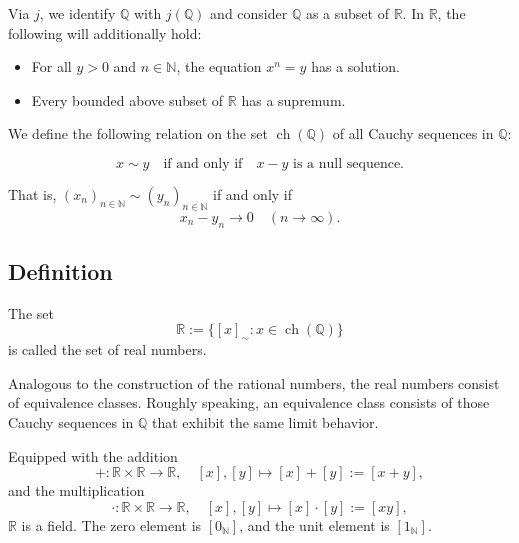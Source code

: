 Via \( j \), we identify \( \mathbb{Q} \) with \( j(\mathbb{Q}) \) and consider \( \mathbb{Q} \) as a subset of \( \mathbb{R} \). In \( \mathbb{R} \), the following will additionally hold:

\begin{itemize}[label=\(-\)]
	\item For all \( y > 0 \) and \( n \in \mathbb{N} \), the equation \( x^n = y \) has a solution.

	\item Every bounded above subset of \( \mathbb{R} \) has a supremum.
\end{itemize}

We define the following relation on the set \( \operatorname{ch}(\mathbb{Q}) \) of all Cauchy sequences in \( \mathbb{Q} \):

\[
	x \sim y \quad \text{if and only if} \quad x - y \text{ is a null sequence}.
\]

That is, \( {(x_n)}_{n \in \mathbb{N}} \sim {(y_n)}_{n \in \mathbb{N}} \) if and only if
\[
	x_n - y_n \to 0 \quad (n \to \infty).
\]

\subsection{Definition}
The set
\[
	\mathbb{R} := \{ {[x]}_{\sim} : x \in \operatorname{ch}(\mathbb{Q}) \}
\]
is called the set of real numbers.

Analogous to the construction of the rational numbers, the real numbers consist of equivalence classes.
Roughly speaking, an equivalence class consists of those Cauchy sequences in \( \mathbb{Q} \) that exhibit the same limit behavior.

Equipped with the addition
\[
	+ : \mathbb{R} \times \mathbb{R} \to \mathbb{R}, \quad [x], [y] \mapsto [x] + [y] := [x + y],
\]
and the multiplication
\[
	\cdot : \mathbb{R} \times \mathbb{R} \to \mathbb{R}, \quad [x], [y] \mapsto [x] \cdot [y] := [xy],
\]
\( \mathbb{R} \) is a field. The zero element is \( [0_{\mathbb{N}}] \), and the unit element is \( [1_{\mathbb{N}}] \).

